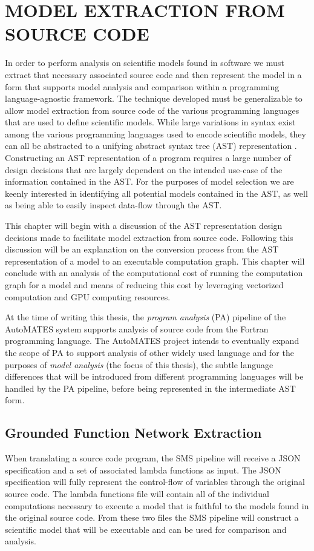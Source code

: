 \chapter{MODEL EXTRACTION FROM SOURCE CODE\label{chapter:extraction}}
In order to perform analysis on scientific models found in software we must  extract that necessary associated source code and then represent the model in a form that supports model analysis and comparison within a programming language-agnostic framework.
The technique developed must be generalizable to allow model extraction from source code of the various programming languages that are used to define scientific models.
While large variations in syntax exist among the various programming languages used to encode scientific models, they can all be abstracted to a unifying abstract syntax tree (AST) representation \citep{aho1986dragonBook}.
Constructing an AST representation of a program requires a large number of design decisions that are largely dependent on the intended use-case of the information contained in the AST.
For the purposes of model selection we are keenly interested in identifying all potential models contained in the AST, as well as being able to easily inspect data-flow through the AST.

This chapter will begin with a discussion of the AST representation design decisions made to facilitate model extraction from source code.
Following this discussion will be an explanation on the conversion process from the AST representation of a model to an executable computation graph.
This chapter will conclude with an analysis of the computational cost of running the computation graph for a model and means of reducing this cost by leveraging vectorized computation and GPU computing resources.

At the time of writing this thesis, the \emph{program analysis} (PA) pipeline of the AutoMATES system supports analysis of source code from the Fortran programming language.
The AutoMATES project intends to eventually expand the scope of PA to support analysis of other widely used language and for the purposes of \emph{model analysis} (the focus of this thesis), the subtle language differences that will be introduced from different programming languages will be handled by the PA pipeline, before being represented in the intermediate AST form.

\section{Grounded Function Network Extraction\label{sec:grfn_extract}}
When translating a source code program, the SMS pipeline will receive a JSON specification and a set of associated lambda functions as input.
The JSON specification will fully represent the control-flow of variables through the original source code.
The lambda functions file will contain all of the individual computations necessary to execute a model that is faithful to the models found in the original source code.
From these two files the SMS pipeline will construct a scientific model that will be executable and can be used for comparison and analysis.

